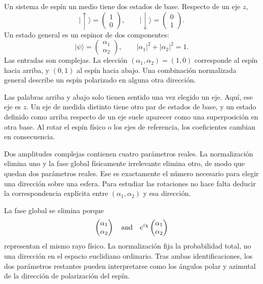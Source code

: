 Un sistema de espín un medio tiene dos estados de base. Respecto de un eje \(z\),
\begin{equation}
\lvert\uparrow\rangle=
\begin{pmatrix}1\\0\end{pmatrix},
\qquad
\lvert\downarrow\rangle=
\begin{pmatrix}0\\1\end{pmatrix}.
\end{equation}
Un estado general es un espinor de dos componentes:
\begin{equation}
\lvert\psi\rangle=
\begin{pmatrix}\alpha_1\\\alpha_2\end{pmatrix},
\qquad
|\alpha_1|^2+|\alpha_2|^2=1.
\label{eq:l3-spinor}
\end{equation}
Las entradas son complejas. La elección \((\alpha_1,\alpha_2)=(1,0)\) corresponde al espín hacia arriba, y \((0,1)\) al espín hacia abajo. Una combinación normalizada general describe un espín polarizado en alguna otra dirección.

Las palabras {arriba} y {abajo} solo tienen sentido una vez elegido un eje. Aquí, ese eje es \(z\). Un eje de medida distinto tiene otro par de estados de base, y un estado definido como arriba respecto de un eje suele aparecer como una superposición en otra base. Al rotar el espín físico o los ejes de referencia, los coeficientes cambian en consecuencia.

Dos amplitudes complejas contienen cuatro parámetros reales. La normalización elimina uno y la fase global físicamente irrelevante elimina otro, de modo que quedan dos parámetros reales. Ese es exactamente el número necesario para elegir una dirección sobre una esfera. Para estudiar las rotaciones no hace falta deducir la correspondencia explícita entre \((\alpha_1,\alpha_2)\) y esa dirección.

La fase global se elimina porque
\begin{equation}
\begin{pmatrix}\alpha_1\\\alpha_2\end{pmatrix}
\quad\hbox{and}\quad
e^{i\chi}
\begin{pmatrix}\alpha_1\\\alpha_2\end{pmatrix}
\end{equation}
representan el mismo rayo físico. La normalización fija la probabilidad total, no una dirección en el espacio euclidiano ordinario. Tras ambas identificaciones, los dos parámetros restantes pueden interpretarse como los ángulos polar y azimutal de la dirección de polarización del espín.

